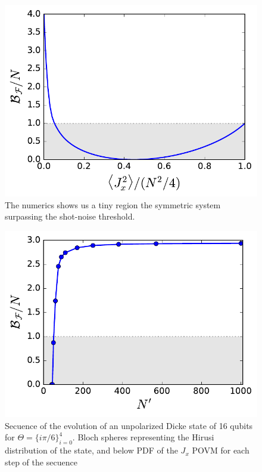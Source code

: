 \begin{figure}
  \centering
  \includegraphics[scale=.65]{img/plots/LT_dicke_edge.pdf}
  \caption{The numerics shows us a tiny region the symmetric system surpassing the shot-noise threshold.}
  \label{fig:vd-secuence-evo}
\end{figure}

\begin{figure}
  \centering
  \includegraphics[scale=.65]{img/plots/LT_dicke_7900_asymp.pdf}
  \caption{Secuence of the evolution of an unpolarized Dicke state of 16 qubits for $\Theta=\{i\pi/6\}_{i=0}^4$. Bloch spheres representing the Hirusi distribution of the state, and below PDF of the $J_x$ POVM for each step of the secuence}
  \label{fig:vd-secuence-evo}
\end{figure}
